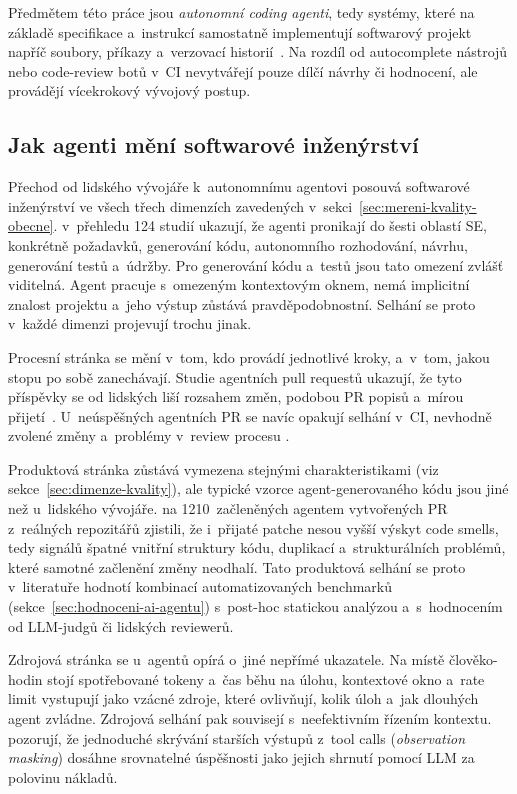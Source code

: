 Předmětem této práce jsou \textit{autonomní coding agenti}, tedy
systémy, které na základě specifikace a~instrukcí samostatně
implementují softwarový projekt napříč soubory, příkazy a~verzovací
historií~\cite{guo2025benchmarks}. Na rozdíl od autocomplete nástrojů
nebo code-review botů v~CI nevytvářejí pouze dílčí návrhy či hodnocení,
ale provádějí vícekrokový vývojový postup.

\subsection{Jak agenti mění softwarové inženýrství}
\label{sec:agenti-meni-sdlc}

Přechod od lidského vývojáře k~autonomnímu agentovi posouvá
softwarové inženýrství ve všech třech dimenzích zavedených
v~sekci~\ref{sec:mereni-kvality-obecne}. \textcite{jin2024llmagents}
v~přehledu 124 studií ukazují, že
agenti pronikají do šesti oblastí SE, konkrétně požadavků, generování kódu,
autonomního rozhodování, návrhu, generování testů a~údržby.
Pro generování kódu a~testů jsou tato omezení zvlášť viditelná.
Agent pracuje s~omezeným kontextovým oknem, nemá implicitní znalost
projektu a~jeho výstup zůstává pravděpodobnostní. Selhání se proto
v~každé dimenzi projevují trochu jinak.

Procesní stránka se mění v~tom, kdo provádí jednotlivé kroky,
a~v~tom, jakou stopu po sobě zanechávají. Studie agentních pull
requestů ukazují, že tyto příspěvky se od lidských liší rozsahem
změn, podobou PR popisů a~mírou přijetí~\cite{watanabe2025agentprs}.
U~neúspěšných agentních PR se navíc opakují selhání v~CI,
nevhodně zvolené změny a~problémy v~review procesu
\cite{ehsani2026failedprs}.

Produktová stránka zůstává vymezena stejnými charakteristikami
(viz sekce~\ref{sec:dimenze-kvality}), ale typické vzorce
agent-generovaného kódu jsou jiné než u~lidského vývojáře.
\textcite{li2026beyondbugfixes} na 1210~začleněných agentem vytvořených PR
z~reálných repozitářů zjistili, že i~přijaté patche nesou vyšší
výskyt code smells, tedy signálů špatné vnitřní struktury kódu,
duplikací a~strukturálních problémů, které samotné začlenění změny neodhalí.
Tato produktová selhání se proto v~literatuře hodnotí
kombinací automatizovaných benchmarků
(sekce~\ref{sec:hodnoceni-ai-agentu}) s~post-hoc statickou analýzou
a~s~hodnocením od LLM-judgů či lidských reviewerů.

Zdrojová stránka se u~agentů opírá o~jiné nepřímé ukazatele. Na místě
člověko-hodin stojí spotřebované tokeny a~čas běhu na úlohu, kontextové
okno a~rate limit vystupují jako vzácné zdroje, které ovlivňují, kolik
úloh a~jak dlouhých agent zvládne. Zdrojová selhání pak souvisejí
s~neefektivním řízením kontextu. \textcite{jetbrains2025complexity}
pozorují, že jednoduché skrývání starších výstupů z~tool calls
(\textit{observation masking}) dosáhne srovnatelné úspěšnosti
jako jejich shrnutí pomocí LLM za polovinu nákladů.

